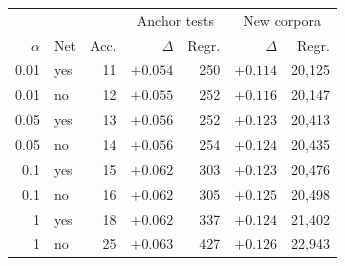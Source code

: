 \begin{tabular*}{\columnwidth}{@{\extracolsep{\fill}}rlrrrrr@{}}
\toprule & & & \multicolumn{2}{c}{Anchor tests} & \multicolumn{2}{c}{New corpora} \\
$\alpha$ & Net & Acc. & $\Delta$ & Regr. & $\Delta$ & Regr. \\\midrule
0.01 & yes & 11 & $+0.054$ & 250 & $+0.114$ & 20,125 \\
0.01 & no & 12 & $+0.055$ & 252 & $+0.116$ & 20,147 \\
0.05 & yes & 13 & $+0.056$ & 252 & $+0.123$ & 20,413 \\
0.05 & no & 14 & $+0.056$ & 254 & $+0.124$ & 20,435 \\
0.1 & yes & 15 & $+0.062$ & 303 & $+0.123$ & 20,476 \\
0.1 & no & 16 & $+0.062$ & 305 & $+0.125$ & 20,498 \\
1 & yes & 18 & $+0.062$ & 337 & $+0.124$ & 21,402 \\
1 & no & 25 & $+0.063$ & 427 & $+0.126$ & 22,943 \\
\bottomrule\end{tabular*}
